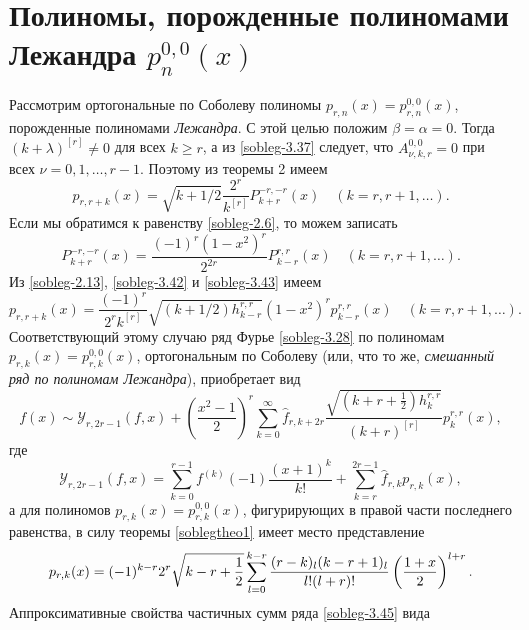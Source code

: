 \section{Полиномы, порожденные полиномами Лежандра $p_{n}^{0,0}(x)$}
Рассмотрим ортогональные по Соболеву полиномы $p_{r,n}(x)=p_{r,n}^{0,0}(x)$, порожденные полиномами \textit{ Лежандра}. С этой целью положим $\beta=\alpha=0$. Тогда  $(k+\lambda)^{[r]}\neq0$ для всех $k\ge r$, а из \eqref{sobleg-3.37} следует, что $A_{\nu,k,r}^{0,0}=0$ при всех  $\nu=0,1,\dots, r-1$. Поэтому из теоремы 2 имеем
\begin{equation}\label{sobleg-3.42}
p_{r,r+k}(x) =\sqrt{k+1/2}
\frac{2^r}{k^{[r]}}P_{k+r}^{-r,-r}(x) \quad (k=r,r+1,\ldots).
\end{equation}
Если мы обратимся к равенству \eqref{sobleg-2.6}, то можем записать
\begin{equation}\label{sobleg-3.43}
P_{k+r}^{-r,-r}(x)= \frac{(-1)^r(1-x^2)^r}{2^{2r}}P_{k-r}^{r,r}(x) \quad (k=r,r+1,\ldots).
\end{equation}
Из \eqref{sobleg-2.13}, \eqref{sobleg-3.42} и \eqref{sobleg-3.43} имеем
\begin{equation}\label{sobleg-3.44}
p_{r,r+k}(x) =
\frac{(-1)^r}{2^rk^{[r]}}\sqrt{(k+1/2)h_{k-r}^{r,r}}(1-x^2)^rp_{k-r}^{r,r}(x) \quad (k=r,r+1,\ldots).
\end{equation}
Соответствующий этому случаю ряд Фурье \eqref{sobleg-3.28} по полиномам $p_{r,k}(x)=p_{r,k}^{0,0}(x)$, ортогональным по Соболеву (или, что то же, \textit{ смешанный ряд по полиномам  Лежандра}), приобретает вид
\begin{equation}\label{sobleg-3.45}
f(x)\sim \mathcal{ Y}_{r,2r-1}(f,x)+\left(\frac{x^2-1}2\right)^r\sum_{k=0}^\infty\hat f_{r,k+2r} \frac{\sqrt{(k+r+\frac12)h_k^{r,r}}}{ (k+r)^{[r]}}p_{k}^{r,r}(x),
\end{equation}
где
\begin{equation*}
 \mathcal{ Y}_{r,2r-1}(f,x)=\sum_{k=0}^{r-1} f^{(k)}(-1)\frac{(x+1)^k}{k!}+\sum_{k=r}^{2r-1} \hat f_{r,k}p_{r,k}(x),
\end{equation*}
а для полиномов $p_{r,k}(x)=p_{r,k}^{0,0}(x)$, фигурирующих в правой части последнего равенства, в силу теоремы \ref{soblegtheo1} имеет место представление
\begin{equation}\label{sobleg-3.46}
p_{r,k}(x)=(-1)^{k-r}2^{r}\sqrt{k-r+\frac12}
\sum_{l=0}^{k-r}{(r-k)_l(k-r+1)_l\over l!(l+r)!}
\left({1+x\over 2}\right)^{l+r}.
\end{equation}
Аппроксимативные свойства частичных сумм ряда \eqref{sobleg-3.45} вида

